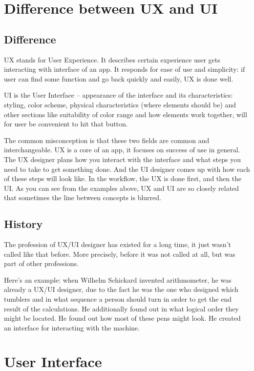 \documentclass[10pt,twoside,english,a4paper]{article}
\begin{document}
\section{Difference between UX and UI} \label{UX/UI}
\subsection{Difference}

UX stands for User Experience. It describes certain experience user gets interacting with interface of an app. It responds for ease of use and simplicity: if user can find some function and go back quickly and easily, UX is done well.

UI is the User Interface – appearance of the interface and its characteristics: styling, color scheme, physical characteristics (where elements should be) and other sections like suitability of color range and how elements work together, will for user be convenient to hit that button. 

The common misconception is that these two fields are common and interchangeable. UX is a core of an app, it focuses on success of use in general. The UX designer plans how you interact with the interface and what steps you need to take to get something done. And the UI designer comes up with how each of these steps will look like. In the workflow, the UX is done first, and then the UI. As you can see from the examples above, UX and UI are so closely related that sometimes the line between concepts is blurred\cite{WhatIsDesign}.

\subsection{History}
The profession of UX/UI designer has existed for a long time, it just wasn't called like that before. More precisely, before it was not called at all, but was part of other professions.

Here’s an example: when Wilhelm Schickard invented arithmometer, he was already a UX/UI designer, due to the fact he was the one who designed which tumblers and in what sequence a person should turn in order to get the end result of the calculations. He additionally found out in what logical order they might be located. He found out how most of these pens might look. He created an interface for interacting with the machine\cite{WhatIsDesign}.



\section{User Interface} \label{UI}
\end{document}
